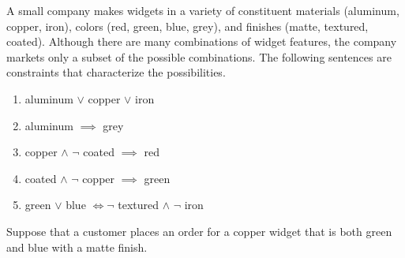 \documentclass[addpoints]{exam}
\begin{document}
\begin{questions}

\question[5] A small company makes widgets in a variety of constituent materials (aluminum, copper, iron), colors (red, green, blue, grey), and finishes (matte, textured, coated). Although there are many combinations of widget features, the company markets only a subset of the possible combinations. The following sentences are constraints that characterize the possibilities. 
  \begin{enumerate}
  \item aluminum $\lor$ copper $\lor$ iron
  \item aluminum $\implies$ grey
  \item copper $\land$ $\neg$ coated $\implies$ red
  \item coated $\land$ $\neg$ copper $\implies$ green
  \item green $\lor$ blue $\iff \neg$ textured $\land$ $\neg$ iron
  \end{enumerate}
  Suppose that a customer places an order for a copper widget that is both green and blue with a matte finish.
  \begin{parts}

\end{parts}
\end{questions}
\end{document}
